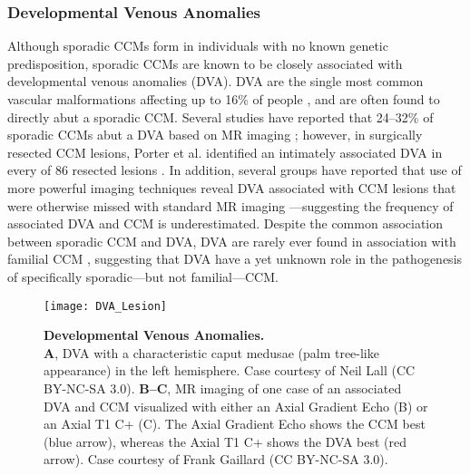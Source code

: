 \subsubsection{Developmental Venous Anomalies}
Although sporadic CCMs form in individuals with no known genetic predisposition, sporadic CCMs are known to be closely associated with developmental venous anomalies (DVA). DVA are the single most common vascular malformations affecting up to 16\% of people \citep{brinjikji2017}, and are often found to directly abut a sporadic CCM. Several studies have reported that 24--32\% of sporadic CCMs abut a DVA based on MR imaging \citep{abdulrauf1999, wurm2005, porter1999}; however, in surgically resected CCM lesions, Porter et al. identified an intimately associated DVA in every of 86 resected lesions \citep{porter1999}. In addition, several groups have reported that use of more powerful imaging techniques reveal DVA associated with CCM lesions that were otherwise missed with standard MR imaging \citep{dammann2017, kamezawa2005}---suggesting the frequency of associated DVA and CCM is underestimated. Despite the common association between sporadic CCM and DVA, DVA are rarely ever found in association with familial CCM \citep{petersen2010}, suggesting that DVA have a yet unknown role in the pathogenesis of specifically sporadic---but not familial---CCM.

\begin{figure}[tbp!]
\begin{center}
\texttt{[image: DVA\_Lesion]}
\end{center}
\caption[Developmental Venous Anomalies.] {\textbf{Developmental Venous Anomalies.} \\ \textbf{A},  DVA with a characteristic caput medusae (palm tree-like appearance) in the left hemisphere. Case courtesy of Neil Lall (CC BY-NC-SA 3.0). \textbf{B--C}, MR imaging of one case of an associated DVA and CCM visualized with either an Axial Gradient Echo (B) or an Axial T1 C+ (C). The Axial Gradient Echo shows the CCM best (blue arrow), whereas the Axial T1 C+ shows the DVA best (red arrow). Case courtesy of Frank Gaillard (CC BY-NC-SA 3.0).}


\label{DVA_Lesion}
\end{figure}

